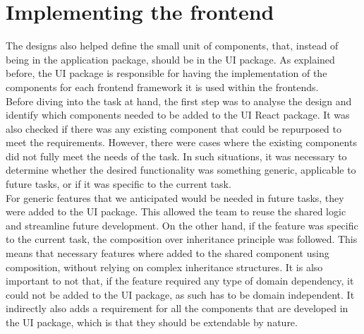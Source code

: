 \documentclass[./memory.tex]{subfiles}
\begin{document}
\section{Implementing the frontend}
The designs also helped define the small unit of components, that, instead of
being in the application package, should be in the UI package. As explained
before, the UI package is responsible for having the implementation of the
components for each frontend framework it is used within the frontends.
\\[8pt]
Before diving into the task at hand, the first step was to analyse the design
and identify which components needed to be added to the UI React package. It was
also checked if there was any existing component that could be repurposed to
meet the requirements. However, there were cases where the existing components
did not fully meet the needs of the task. In such situations, it was necessary
to determine whether the desired functionality was something generic, applicable
to future tasks, or if it was specific to the current task.
\\
For generic features that we anticipated would be needed in future tasks, they
were added to the UI package. This allowed the team to reuse the shared logic
and streamline future development. On the other hand, if the feature was specific
to the current task, the composition over inheritance principle was followed.
This means that necessary features where added to the shared component using
composition, without relying on complex inheritance structures. It is also
important to not that, if the feature required any type of domain dependency, it
could not be added to the UI package, as such has to be domain independent. It
indirectly also adds a requirement for all the components that are developed in
the UI package, which is that they should be extendable by nature.
\end{document}

